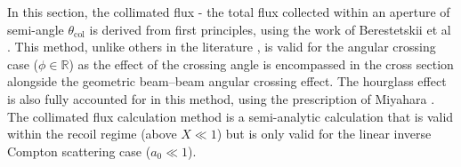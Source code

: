 \documentclass[../main.tex]{subfiles}
\begin{document}
In this section, the collimated flux - the total flux collected within an aperture of semi-angle $\theta_{\mathrm{col}}$ is derived from first principles, using the work of Berestetskii et al \cite{berestetskii1982quantum}. This method, unlike others in the literature \cite{curatolo2017analytical}, is valid for the angular crossing case ($\phi\in\mathbb{R}$) as the effect of the crossing angle is encompassed in the cross section alongside the geometric beam--beam angular crossing effect. The hourglass effect is also fully accounted for in this method, using the prescription of Miyahara \cite{miyahara2008luminosity}. The collimated flux calculation method is a semi-analytic calculation that is valid within the recoil regime (above $X\ll1$) but is only valid for the linear inverse Compton scattering case ($a_{0}\ll1$).
\end{document}
